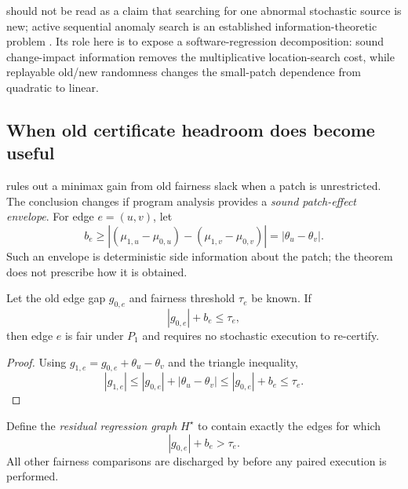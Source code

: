  should not be read as a claim that searching for one
abnormal stochastic source is new; active sequential anomaly search is an
established information-theoretic problem \cite{CohenZhao2015}.  Its role here is
to expose a software-regression decomposition: sound change-impact information
removes the multiplicative location-search cost, while replayable old/new
randomness changes the small-patch dependence from quadratic to linear.


\subsection{When old certificate headroom does become useful}

 rules out a minimax gain from old fairness slack
when a patch is unrestricted.  The conclusion changes if program analysis
provides a \emph{sound patch-effect envelope}.  For edge \(e=(u,v)\), let
\begin{equation}\label{eq:appendix-07-regression-consequences-014}
b_e
\ge
|(\mu_{1,u}-\mu_{0,u})-(\mu_{1,v}-\mu_{0,v})|
=
|\theta_u-\theta_v|.
\end{equation}
Such an envelope is deterministic side information about the patch; the theorem
does not prescribe how it is obtained.

\begin{proposition}
\label{arch:prop:certificate-pruning}
Let the old edge gap \(g_{0,e}\) and fairness threshold \(\tau_e\) be known.  If
\begin{equation}\label{eq:appendix-07-regression-consequences-015}
|g_{0,e}|+b_e\le\tau_e,
\end{equation}
then edge \(e\) is fair under \(P_1\) and requires no stochastic execution to
re-certify.
\end{proposition}

\begin{proof}
Using \(g_{1,e}=g_{0,e}+\theta_u-\theta_v\) and the triangle inequality,
\begin{equation}\label{eq:appendix-07-regression-consequences-016}
|g_{1,e}|
\le
|g_{0,e}|+|\theta_u-\theta_v|
\le
|g_{0,e}|+b_e
\le
\tau_e.
\end{equation}
\end{proof}

Define the \emph{residual regression graph} \(H^\star\) to contain exactly the
edges for which
\begin{equation}\label{eq:appendix-07-regression-consequences-017}
|g_{0,e}|+b_e>\tau_e.
\end{equation}
All other fairness comparisons are discharged by
 before any paired execution is performed.

